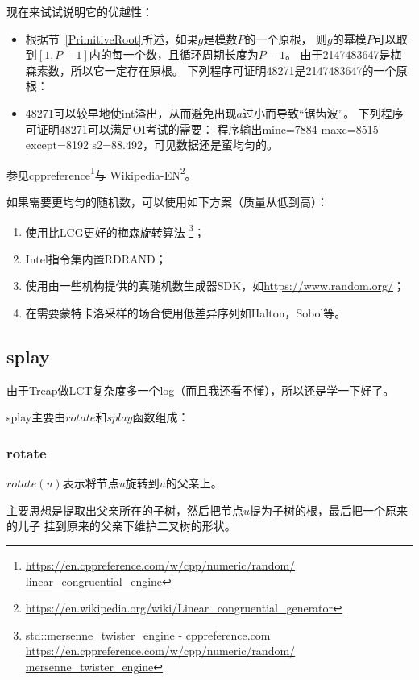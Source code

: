 现在来试试说明它的优越性：

\begin{itemize}
	\item 根据节~\ref{PrimitiveRoot}所述，如果$g$是模数$P$的一个原根，
	      则$g$的幂模$P$可以取到$[1,P-1]$内的每一个数，且循环周期长度为$P-1$。
	      由于2147483647是梅森素数，所以它一定存在原根。
	      下列程序可证明48271是2147483647的一个原根：
	      
	\item 48271可以较早地使int溢出，从而避免出现$a$过小而导致``锯齿波''。
	      下列程序可证明48271可以满足OI考试的需要：
	      程序输出minc=7884 maxc=8515 except=8192 s2=88.492，可见数据还是蛮均匀的。
\end{itemize}

参见cppreference\footnote{
	\url{https://en.cppreference.com/w/cpp/numeric/random/
		linear\_congruential\_engine}}与
Wikipedia-EN\footnote{
	\url{https://en.wikipedia.org/wiki/Linear\_congruential\_generator}}。

如果需要更均匀的随机数，可以使用如下方案（质量从低到高）：
\begin{enumerate}
	\item 使用比LCG更好的梅森旋转算法
	      \footnote{std::mersenne\_twister\_engine - cppreference.com
		      \url{https://en.cppreference.com/w/cpp/numeric/random/
			      mersenne\_twister\_engine}}；
	\item Intel指令集内置RDRAND；
	\item 使用由一些机构提供的真随机数生成器SDK，如\url{https://www.random.org/}；
	\item 在需要蒙特卡洛采样的场合使用低差异序列如Halton，Sobol等。
\end{enumerate}

\subsection{splay}\label{splay}

由于Treap做LCT复杂度多一个log（而且我还看不懂），所以还是学一下好了。

splay主要由$rotate$和$splay$函数组成：

\subsubsection{rotate}

$rotate(u)$表示将节点$u$旋转到$u$的父亲上。

主要思想是提取出父亲所在的子树，然后把节点$u$提为子树的根，最后把一个原来的儿子
挂到原来的父亲下维护二叉树的形状。

